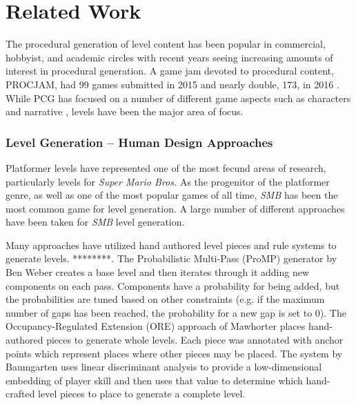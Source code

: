 \documentclass[12pt]{report}
\begin{document}
\section*{Related Work}

The procedural generation of level content has been popular in commercial, hobbyist, and academic circles with recent years seeing increasing amounts of interest in procedural generation.   A game jam devoted to procedural content, PROCJAM, had 99 games submitted in 2015 and nearly double, 173, in 2016 \cite{PROCJAM2015,PROCJAM2016}.  While PCG has focused on a number of different game aspects such as characters \cite{SOMETHING} and narrative \cite{SOMETHING}, levels have been the major area of focus.   

\subsubsection*{Level Generation -- Human Design Approaches}
Platformer levels have represented one of the most fecund areas of research, particularly levels for \textit{Super Mario Bros.}  As the progenitor of the platformer genre, as well as one of the most popular games of all time, \textit{SMB} has been the most common game for level generation.  A large number of different approaches have been taken for \textit{SMB} level generation.

Many approaches have utilized hand authored level pieces and rule systems to generate levels. ****\cite{KATES Procedural Level Design for Platform Games}****. The Probabilistic Multi-Pass (ProMP) generator by Ben Weber \cite{mario2010} creates a base level and then iterates through it adding new components on each pass.  Components have a probability for being added, but the probabilities are tuned based on other constraints (e.g. if the maximum number of gaps has been reached, the probability for a new gap is set to 0).  The Occupancy-Regulated Extension (ORE) approach of Mawhorter \cite{mawhorterORE} places hand-authored pieces to generate whole levels.  Each piece was annotated with anchor points which represent places where other pieces may be placed.   The system by Baumgarten \cite{mario2010} uses linear discriminant analysis to provide a low-dimensional embedding of player skill and then uses that value to determine which hand-crafted level pieces to place to generate a complete level. 
\end{document}
